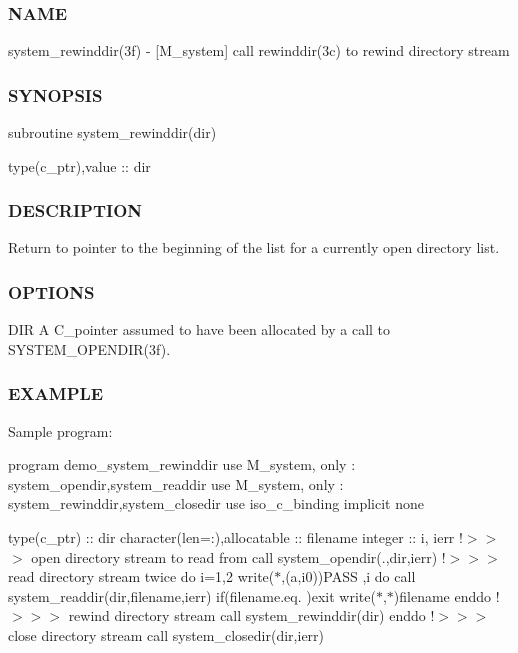\subsubsection*{N\+A\+ME}

system\+\_\+rewinddir(3f) -\/ \mbox{[}M\+\_\+system\mbox{]} call rewinddir(3c) to rewind directory stream \subsubsection*{S\+Y\+N\+O\+P\+S\+IS}

subroutine system\+\_\+rewinddir(dir)

type(c\+\_\+ptr),value \+:\+: dir

\subsubsection*{D\+E\+S\+C\+R\+I\+P\+T\+I\+ON}

Return to pointer to the beginning of the list for a currently open directory list.

\subsubsection*{O\+P\+T\+I\+O\+NS}

D\+IR A C\+\_\+pointer assumed to have been allocated by a call to S\+Y\+S\+T\+E\+M\+\_\+\+O\+P\+E\+N\+D\+I\+R(3f).

\subsubsection*{E\+X\+A\+M\+P\+LE}

Sample program\+:

program demo\+\_\+system\+\_\+rewinddir use M\+\_\+system, only \+: system\+\_\+opendir,system\+\_\+readdir use M\+\_\+system, only \+: system\+\_\+rewinddir,system\+\_\+closedir use iso\+\_\+c\+\_\+binding implicit none

type(c\+\_\+ptr) \+:\+: dir character(len=\+:),allocatable \+:\+: filename integer \+:\+: i, ierr !$>$$>$$>$ open directory stream to read from call system\+\_\+opendir(\textquotesingle{}.\textquotesingle{},dir,ierr) !$>$$>$$>$ read directory stream twice do i=1,2 write($\ast$,\textquotesingle{}(a,i0)\textquotesingle{})\textquotesingle{}P\+A\+SS \textquotesingle{},i do call system\+\_\+readdir(dir,filename,ierr) if(filename.\+eq.\textquotesingle{} \textquotesingle{})exit write($\ast$,$\ast$)filename enddo !$>$$>$$>$ rewind directory stream call system\+\_\+rewinddir(dir) enddo !$>$$>$$>$ close directory stream call system\+\_\+closedir(dir,ierr)

